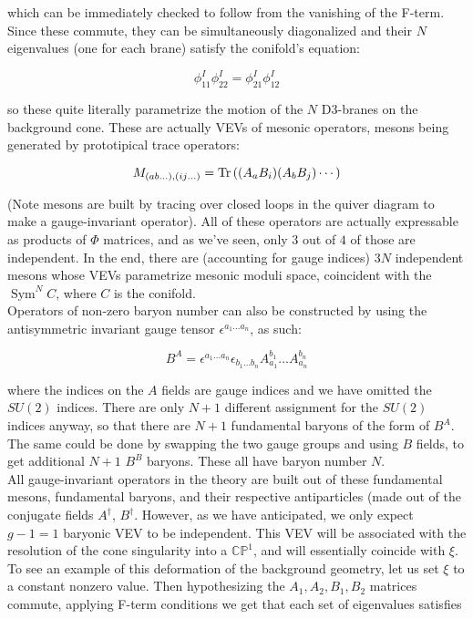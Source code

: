 which can be immediately checked to follow from the vanishing of the F-term. Since these commute, they can be simultaneously diagonalized and their $N$ eigenvalues (one for each brane) satisfy the conifold's equation:

\begin{equation}
	\phi^I_{11} \phi^I_{22} = \phi_{21}^I \phi_{12}^I
	\label{}
\end{equation}

so these quite literally parametrize the motion of the $N$ D3-branes on the background cone. These are actually VEVs of mesonic operators, mesons being generated by prototipical trace operators:

\begin{equation}
	M_{(ab\ldots),(ij\ldots)} =	\operatorname{Tr}\left( (A_a B_i)(A_b B_j)\cdots \right)
	\label{}
\end{equation}

(Note mesons are built by tracing over closed loops in the quiver diagram to make a gauge-invariant operator). All of these operators are actually expressable as products of $\Phi$ matrices, and as we've seen, only $3$ out of $4$ of those are independent. In the end, there are (accounting for gauge indices) $3N$ independent mesons whose VEVs parametrize mesonic moduli space, coincident with the $\operatorname{Sym}^N C$, where $C$ is the conifold.\\

Operators of non-zero baryon number can also be constructed by using the antisymmetric invariant gauge tensor $\epsilon^{a_1\ldots a_n}$, as such:

\begin{equation}
	B^A = \epsilon^{a_1\ldots a_n} \epsilon_{b_1\ldots b_n} A_{a_1}^{b_1} \ldots A^{b_n}_{a_n}
	\label{}
\end{equation}

where the indices on the $A$ fields are gauge indices and we have omitted the $SU(2)$ indices. There are only $N+1$ different assignment for the $SU(2)$ indices anyway, so that there are $N+1$ fundamental baryons of the form of $B^A$. The same could be done by swapping the two gauge groups and using $B$ fields, to get additional $N+1$ $B^B$ baryons. These all have baryon number $N$.\\

All gauge-invariant operators in the theory are built out of these fundamental mesons, fundamental baryons, and their respective antiparticles (made out of the conjugate fields $A^\dagger$, $B^\dagger$. However, as we have anticipated, we only expect $g-1 = 1$ baryonic VEV to be independent. This VEV will be associated with the resolution of the cone singularity into a $\mathbb{CP}^1$, and will essentially coincide with $\xi$. To see an example of this deformation of the background geometry, let us set $\xi$ to a constant nonzero value. Then hypothesizing the $A_1, A_2, B_1, B_2$ matrices commute, applying F-term conditions we get that each set of eigenvalues satisfies

